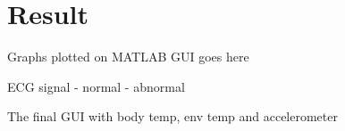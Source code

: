 \section{Result}
Graphs plotted on MATLAB GUI goes here

ECG signal
- normal
- abnormal

The final GUI with body temp, env temp and accelerometer


